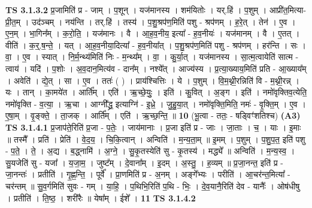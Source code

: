 \documentclass[17pt]{extarticle}
\begin{document}
                  \newline
                                \textbf{ TS 3.1.3.2} \newline
                  प्र॒जामिति॑ प्र - जाम् । प॒शून् । यज॑मानस्य । शम॑यितोः । यर्.हि॑ । प॒शुम् । आप्री॑त॒मित्या-प्री॒त॒म् । उद॑ञ्चम् । नय॑न्ति । तर्.हि॑ । तस्य॑ । प॒शु॒श्रप॑ण॒मिति॑ पशु - श्रप॑णम् । ह॒रे॒त् । तेन॑ । ए॒व । ए॒न॒म् । भा॒गिन᳚म् । क॒रो॒ति॒ । यज॑मानः । वै । आ॒ह॒व॒नीय॒ इत्या᳚ - ह॒व॒नीयः॑ । यज॑मानम् । वै । ए॒तत् । वीति॑ । क॒र्॒.ष॒न्ते॒ । यत् । आ॒ह॒व॒नीया॒दित्या᳚ - ह॒व॒नीया᳚त् । प॒शु॒श्रप॑ण॒मिति॑ पशु - श्रप॑णम् । हर॑न्ति । सः । वा॒ । ए॒व । स्यात् । नि॒र्म॒न्थ्य॑मिति॑ निः - म॒न्थ्य᳚म् । वा॒ । कु॒र्या॒त् । यज॑मानस्य । सा॒त्म॒त्वायेति॑ सात्म - त्वाय॑ । यदि॑ । प॒शोः । अ॒व॒दान॒मित्य॑व - दान᳚म् । नश्ये᳚त् । आज्य॑स्य । प्र॒त्या॒ख्याय॒मिति॑ प्रति - आ॒ख्याय᳚म् । अवेति॑ । द्ये॒त् । सा । ए॒व । ततः॑ ( ) । प्राय॑श्चित्तिः । ये । प॒शुम् । वि॒म॒थ्नी॒रन्निति॑ वि - म॒थ्नी॒रन्न् । यः । तान् । का॒मये॑त । आर्ति᳚म् । एति॑ । ऋ॒च्छे॒युः॒ । इति॑ । कु॒वित् । अ॒ङ्ग । इति॑ । नमो॑वृक्तिव॒त्येति॒ नमो॑वृक्ति - व॒त्या॒ । ऋ॒चा । आग्नी᳚द्ध्र॒ इत्याग्नि॑ - इ॒ध्रे॒ । जु॒हु॒या॒त् । नमो॑वृक्ति॒मिति॒ नमः॑ - वृ॒क्ति॒म् । ए॒व । ए॒षा॒म् । वृ॒ङ्क्ते॒ । ता॒जक् । आर्ति᳚म् । एति॑ । ऋ॒च्छ॒न्ति॒ ॥ \textbf{  10} \newline
                  \newline
                      (भू॒त्वा - ततः॒ - षड्विꣳ॑शतिश्च)  \textbf{(A3)} \newline \newline
                                \textbf{ TS 3.1.4.1} \newline
                  प्र॒जाप॑ते॒रिति॑ प्र॒जा - प॒तेः॒ । जाय॑मानाः । प्र॒जा इति॑ प्र - जाः । जा॒ताः । च॒ । याः । इ॒माः ॥ तस्मै᳚ । प्रति॑ । प्रेति॑ । वे॒द॒य॒ । चि॒कि॒त्वान् । अन्विति॑ । म॒न्य॒ता॒म् ॥ इ॒मम् । प॒शुम् । प॒शु॒प॒त॒ इति॑ पशु - प॒ते॒ । ते॒ । अ॒द्य । ब॒द्ध्नामि॑ । अ॒ग्ने॒ । सु॒कृ॒तस्येति॑ सु - कृ॒तस्य॑ । मद्ध्ये᳚ ॥ अन्विति॑ । म॒न्य॒स्व॒ । सु॒यजेति॑ सु - यजा᳚ । य॒जा॒म॒ । जुष्ट᳚म् । दे॒वाना᳚म् । इ॒दम् । अ॒स्तु॒ । ह॒व्यम् ॥ प्र॒जा॒नन्त॒ इति॑ प्र - जा॒नन्तः॑ । प्रतीति॑ । गृ॒ह्ण॒न्ति॒ । पूर्वे᳚ । प्रा॒णमिति॑ प्र - अ॒नम् । अङ्गे᳚भ्यः । परीति॑ । आ॒चर॑न्त॒मित्या᳚ - चर॑न्तम् ॥ सु॒व॒र्गमिति॑ सुवः - गम् । या॒हि॒ । प॒थिभि॒रिति॑ प॒थि - भिः॒ । दे॒व॒यानै॒रिति॑ देव - यानैः᳚ । ओष॑धीषु । प्रतीति॑ । ति॒ष्ठ॒ । शरी॑रैः ॥ येषा᳚म् । ईशे᳚ । \textbf{  11} \newline
                  \newline
                                \textbf{ TS 3.1.4.2} \newline
\end{document}
